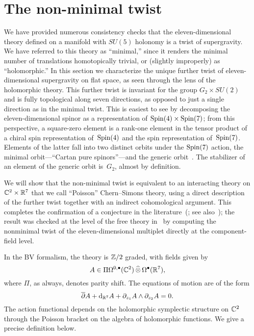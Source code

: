 \section{The non-minimal twist}\label{s:nonmin}

We have provided numerous consistency checks that the eleven-dimensional theory defined on a manifold with $SU(5)$ holonomy is a twist of supergravity. 
We have referred to this theory as ``minimal,'' since it renders the minimal number of translations homotopically trivial, or (slightly improperly) as ``holomorphic.''
In this section we characterize the unique further twist of eleven-dimensional supergravity on flat space, as seen through the lens of the holomorphic theory.  
This further twist is invariant for the group $G_2 \times SU(2)$ and is fully topological along seven directions, as opposed to just a single direction as in the minimal twist. This is easiest to see by decomposing the eleven-dimensional spinor as a representation of $\operatorname{Spin}(4) \times \operatorname{Spin}(7)$; from this perspective, a square-zero element is a rank-one element in the tensor product of a chiral spin representation of~$\operatorname{Spin}(4)$ and the spin representation of~$\operatorname{Spin}(7)$. Elements of the latter fall into two distinct orbits under the $\operatorname{Spin}(7)$ action, the minimal orbit---``Cartan pure spinors''---and the generic orbit~\cite{Igusa}. The stabilizer of an element of the generic orbit is~$G_2$, almost by definition.

We will show that the non-minimal twist is equivalent to an interacting theory on $\mathbb C^2 \times \mathbb R^7$ that we call ``Poisson'' Chern--Simons theory, using a direct description of the further twist together with an indirect cohomological argument. This completes the confirmation of a conjecture in the literature~(\cite{CostelloM5}; see also~\cite{RY}); the result was checked at the level of the free theory in~\cite{EagerHahner} by computing the nonminimal twist of the eleven-dimensional multiplet directly at the component-field level.

In the BV formalism, the theory is $\mathbb Z/2$ graded, with fields given by
\[
A \in \Pi \Omega^{0,\bullet}(\mathbb C^2) \, \widehat{\otimes} \, \Omega^\bullet(\mathbb R^7) ,
\]
where $\Pi$, as always, denotes parity shift.
The equations of motion are of the form
\[
\overline{\partial} A + {\rm d}_{\mathbb R^7} A + \partial_{z_1} A \wedge \partial_{z_2} A = 0 .
\]
The action functional depends on the holomorphic symplectic structure on $\mathbb C^2$ through the Poisson bracket on the algebra of holomorphic functions.
We give a precise definition below. 


